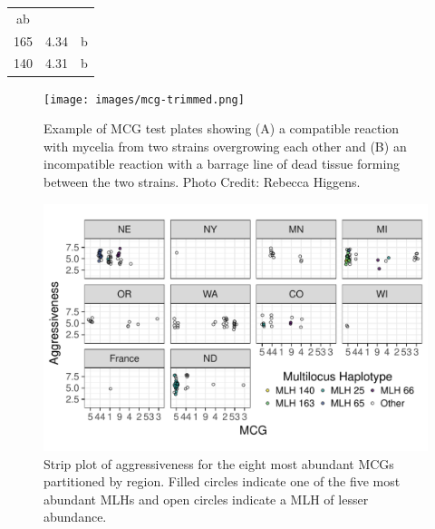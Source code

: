 \documentclass[fleqn,10pt,lineno]{wlpeerj} %
\theoremstyle{definition}
\theoremstyle{definition}
\theoremstyle{definition}
\theoremstyle{remark}
\begin{document}
\begin{longtable}[]{@{}cll@{}}
\begin{minipage}[t]{0.08\columnwidth}
ab\strut
\end{minipage}\tabularnewline
\begin{minipage}[t]{0.10\columnwidth}\centering\strut
165\strut
\end{minipage} & \begin{minipage}[t]{0.25\columnwidth}\raggedright\strut
4.34\strut
\end{minipage} & \begin{minipage}[t]{0.08\columnwidth}\raggedright\strut
b\strut
\end{minipage}\tabularnewline
\begin{minipage}[t]{0.10\columnwidth}\centering\strut
140\strut
\end{minipage} & \begin{minipage}[t]{0.25\columnwidth}\raggedright\strut
4.31\strut
\end{minipage} & \begin{minipage}[t]{0.08\columnwidth}\raggedright\strut
b\strut
\end{minipage}\tabularnewline
\bottomrule
\end{longtable}

\begin{figure}
\centering
\texttt{[image: images/mcg-trimmed.png]}
\caption{Example of MCG test plates showing (A) a compatible reaction
with mycelia from two strains overgrowing each other and (B) an
incompatible reaction with a barrage line of dead tissue forming between
the two strains. Photo Credit: Rebecca Higgens.}\label{mcg-fig}
\end{figure}

\begin{figure}
\centering
\includegraphics[width=1.00000\textwidth]{../../results/figures/publication/RMM-aggressiveness.pdf}
\caption{Strip plot of aggressiveness for the eight most abundant MCGs
partitioned by region. Filled circles indicate one of the five most
abundant MLHs and open circles indicate a MLH of lesser
abundance.}\label{mcg-mlh-region-aggressiveness}
\end{figure}
\end{document}
